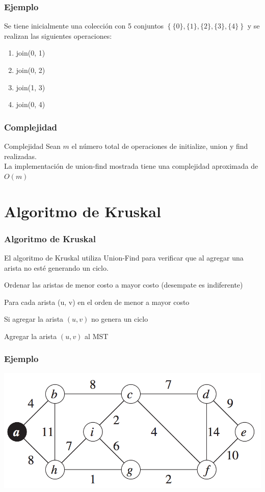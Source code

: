 \documentclass{beamer}
\begin{document}
	\begin{frame}[fragile]
		\frametitle{Ejemplo}
		Se tiene inicialmente una colección con 5 conjuntos $\left\{\{0\}, \{1\}, \{2\}, \{3\}, \{4\}\right\}$ y se realizan las siguientes operaciones:
		\begin{enumerate}
			\item join(0, 1)
			\item join(0, 2)
			\item join(1, 3)
			\item join(0, 4)
		\end{enumerate}
	\end{frame}
	
	\begin{frame}
		\frametitle{Complejidad}
		\begin{block}{Complejidad}
			Sean $m$ el número total de operaciones de initialize, union y find realizadas.\\
			La implementación de union-find mostrada tiene una complejidad aproximada de $O(m)$
		\end{block}
	\end{frame}

\section[Kruskal]{Algoritmo de Kruskal}
	\begin{frame}
		\frametitle{Algoritmo de Kruskal}
		El algoritmo de Kruskal utiliza Union-Find para verificar que al agregar una arista no esté generando un ciclo.
		\begin{enumerate}
			\item Ordenar las aristas de menor costo a mayor costo (desempate es indiferente)
			\item Para cada arista (u, v) en el orden de menor a mayor costo
			{\setlength\itemindent{15pt} \item Si agregar la arista $(u, v)$ no genera un ciclo}
			{\setlength\itemindent{30pt} \item Agregar la arista $(u, v)$ al MST}
		\end{enumerate}
	\end{frame}

	\begin{frame}
		\frametitle{Ejemplo}
		\includegraphics[width = \textwidth]{Ejemplo.png}
	\end{frame}
	
\end{document}
